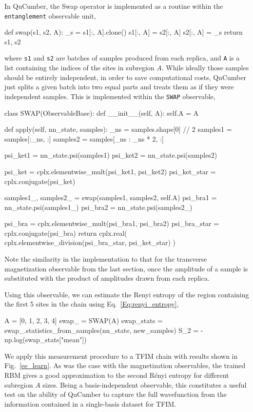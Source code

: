 \documentclass[submission, Phys, hidelnks]{SciPost}
\begin{document}
In QuCumber, the Swap operator is implemented as a routine within the
\verb|entanglement| observable unit,
\begin{python}
def swap(s1, s2, A):
    _s = s1[:, A].clone()
    s1[:, A] = s2[:, A]
    s2[:, A] = _s
    return s1, s2
\end{python}
where \verb|s1| and \verb|s2| are batches of samples produced from each replica,
and \verb|A| is a list containing the indices of the sites in subregion $A$.
While ideally those samples should be entirely independent, in order to save
computational costs, QuCumber just splits a given batch into two equal parts and
treats them as if they were independent samples. This is implemented within the
\verb|SWAP| observable,
\begin{python}
class SWAP(ObservableBase):
    def __init__(self, A):
        self.A = A

    def apply(self, nn_state, samples):
        _ns = samples.shape[0] // 2
        samples1 = samples[:_ns, :]
        samples2 = samples[_ns : _ns * 2, :]

        psi_ket1 = nn_state.psi(samples1)
        psi_ket2 = nn_state.psi(samples2)

        psi_ket = cplx.elementwise_mult(psi_ket1, psi_ket2)
        psi_ket_star = cplx.conjugate(psi_ket)

        samples1_, samples2_ = swap(samples1, samples2, self.A)
        psi_bra1 = nn_state.psi(samples1_)
        psi_bra2 = nn_state.psi(samples2_)

        psi_bra = cplx.elementwise_mult(psi_bra1, psi_bra2)
        psi_bra_star = cplx.conjugate(psi_bra)
        return cplx.real(
            cplx.elementwise_division(psi_bra_star, psi_ket_star)
        )
\end{python}
Note the similarity in the implementation to that for the transverse
magnetization observable from the last section, once the amplitude of a sample
is substituted with the product of amplitudes drawn from each replica.

Using this observable, we can estimate the Renyi entropy of the region containing
the first 5 sites in the chain using Eq.~\ref{Eq:renyi_entropy},
\begin{python}
A = [0, 1, 2, 3, 4]
swap_ = SWAP(A)
swap_stats = swap_.statistics_from_samples(nn_state, new_samples)
S_2 = -np.log(swap_stats["mean"])
\end{python}

We apply this measurement procedure to a TFIM chain with results shown in
Fig.~\ref{ee_learn}. As was the case with the magnetization observables, the trained
RBM gives a good approximation to the second R\'enyi entropy for different subregion
$A$ sizes. Being a basis-independent observable, this constitutes a useful test on
the ability of QuCumber to capture the full wavefunction from the information contained
in a single-basis dataset for TFIM.
\end{document}
